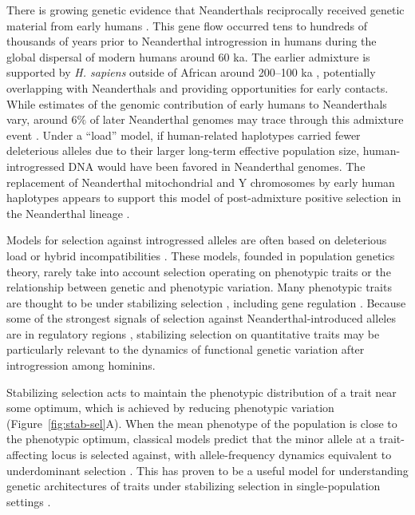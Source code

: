 \documentclass{article}
\begin{document}
There is growing genetic evidence that Neanderthals reciprocally received
genetic material from early humans \citep{kuhlwilm2016ancient,
hubisz2020mapping, harris2023diverse, li2024recurrent}. This gene flow occurred
tens to hundreds of thousands of years prior to Neanderthal introgression in
humans during the global dispersal of modern humans around 60 ka. The earlier
admixture is supported by \emph{H. sapiens} outside of African around 200--100
ka \citep{schwarcz1988esr, grun2005u, harvati2019apidima, beyer2021climatic},
potentially overlapping with Neanderthals and providing opportunities for early
contacts. While estimates of the genomic contribution of early humans to
Neanderthals vary, around $6\%$ of later Neanderthal genomes may trace through
this admixture event \citep{harris2023diverse}. Under a ``load'' model, if
human-related haplotypes carried fewer deleterious alleles due to their larger
long-term effective population size, human-introgressed DNA would have been
favored in Neanderthal genomes. The replacement of Neanderthal mitochondrial
and Y chromosomes by early human haplotypes appears to support this model of
post-admixture positive selection in the Neanderthal lineage
\citep{posth2017deeply, petr2020evolutionary}.

Models for selection against introgressed alleles are often based on
deleterious load or hybrid incompatibilities \citep{muller1942isolating}. These
models, founded in population genetics theory, rarely take into account
selection operating on phenotypic traits or the relationship between genetic
and phenotypic variation.  Many phenotypic traits are thought to be under
stabilizing selection \citep{sanjak2018evidence, sella2019thinking}, including
gene regulation \citep{gilad2006natural, hodgins2015gene, price2022detecting}.
Because some of the strongest signals of selection against
Neanderthal-introduced alleles are in regulatory regions
\citep{sankararaman2014genomic}, stabilizing selection on quantitative traits
may be particularly relevant to the dynamics of functional genetic variation
after introgression among hominins.

Stabilizing selection acts to maintain the phenotypic distribution of a trait
near some optimum, which is achieved by reducing phenotypic variation
(Figure~\ref{fig:stab-sel}A). When the mean phenotype of the population is
close to the phenotypic optimum, classical models predict that the minor allele
at a trait-affecting locus is selected against, with allele-frequency dynamics
equivalent to underdominant selection \citep{robertson1956effect}. This has
proven to be a useful model for understanding genetic architectures of traits
under stabilizing selection in single-population settings
\citep[e.g.,][]{keightley1988quantitative, simons2018population,
hayward2022polygenic}.
\end{document}
